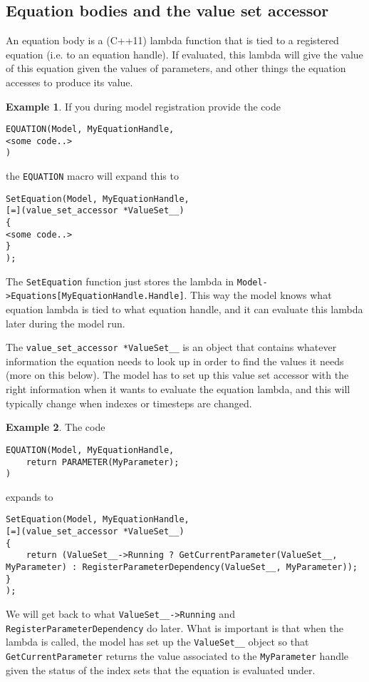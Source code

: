 \documentclass[11pt]{article}
\theoremstyle{definition}
\newtheorem{myexample}{Example}
\newenvironment{example}%
  {\begin{lrbox}{\examplebox}%
   \begin{minipage}{\dimexpr\linewidth-2\fboxsep}
   \begin{myexample}}%
  {\end{myexample}%
   \end{minipage}%
   \end{lrbox}%
   \begin{trivlist}
     \item[]\colorbox{silver}{\usebox\examplebox}
   \end{trivlist}}
\begin{document}
\subsection{Equation bodies and the value set accessor}

An equation body is a (C++11) lambda function that is tied to a registered equation (i.e. to an equation handle). If evaluated, this lambda will give the value of this equation given the values of parameters, and other things the equation accesses to produce its value.

\begin{example}
If you during model registration provide the code
\begin{lstlisting}[style=mycpp]
EQUATION(Model, MyEquationHandle,
<some code..>
)
\end{lstlisting}
the {\tt EQUATION} macro will expand this to
\begin{lstlisting}[style=mycpp]
SetEquation(Model, MyEquationHandle,
[=](value_set_accessor *ValueSet__)
{
<some code..>
}
);
\end{lstlisting}
\end{example}
The {\tt SetEquation} function just stores the lambda in {\tt Model->Equations[MyEquationHandle.Handle]}. This way the model knows what equation lambda is tied to what equation handle, and it can evaluate this lambda later during the model run.

The {\tt value\_set\_accessor *ValueSet\_\_} is an object that contains whatever information the equation needs to look up in order to find the values it needs (more on this below). The model has to set up this value set accessor with the right information when it wants to evaluate the equation lambda, and this will typically change when indexes or timesteps are changed.

\begin{example}
The code
\begin{lstlisting}[style=mycpp]
EQUATION(Model, MyEquationHandle,
	return PARAMETER(MyParameter);
)
\end{lstlisting}
expands to
\begin{lstlisting}[style=mycpp]
SetEquation(Model, MyEquationHandle,
[=](value_set_accessor *ValueSet__)
{
	return (ValueSet__->Running ? GetCurrentParameter(ValueSet__, MyParameter) : RegisterParameterDependency(ValueSet__, MyParameter));
}
);
\end{lstlisting}
\end{example}
We will get back to what {\tt ValueSet\_\_->Running} and {\tt RegisterParameterDependency} do later. What is important is that when the lambda is called, the model has set up the {\tt ValueSet\_\_} object so that {\tt GetCurrentParameter} returns the value associated to the {\tt MyParameter} handle given the status of the index sets that the equation is evaluated under.
\end{document}
